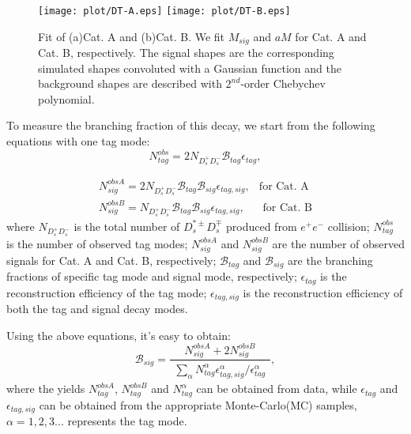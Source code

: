 {    \begin{figure*}[!htbp]
        \centering
        \texttt{[image: plot/DT-A.eps]}
        \texttt{[image: plot/DT-B.eps]}
        \caption{Fit of (a)Cat. A and (b)Cat. B.
            We fit $M_{sig}$ and $aM$ for Cat. A and Cat. B, respectively. The signal shapes are the corresponding simulated shapes convoluted with a Gaussian function and 
        the background shapes are described with $2^{nd}$-order Chebychev polynomial.}
        \label{DT-fit}
    \end{figure*}

    To measure the branching fraction of this decay, we start from the following equations with one tag mode:
    \begin{equation}
        N_{tag}^{obs} = 2N_{D_{s}^{+}D_{s}^{-}}\mathcal{B}_{tag}\epsilon_{tag}, \label{eq-ST}
    \end{equation}

    \begin{equation}
        \begin{array}{lr}
            N_{sig}^{obsA}=2N_{D_{s}^{+}D_{s}^{-}}\mathcal{B}_{tag}\mathcal{B}_{sig}\epsilon_{tag,sig}  , &\text{for Cat. A} \\
            N_{sig}^{obsB}=N_{D_{s}^{+}D_{s}^{-}}\mathcal{B}_{tag}\mathcal{B}_{sig}\epsilon_{tag,sig}  ,  &\text{  for Cat. B}  
        \end{array}
        \label{eq-DT}
    \end{equation}
    where $N_{D_{s}^{+}D_{s}^{-}}$ is the total number of $D_{s}^{*\pm}D_{s}^{\mp}$ produced from $e^{+}e^{-}$ collision; $N_{tag}^{obs}$ is the number of observed tag modes; $N_{sig}^{obsA}$ and $N_{sig}^{obsB}$ are the number of observed signals for Cat. A and Cat. B, respectively; $\mathcal{B}_{tag}$ and $\mathcal{B}_{sig}$ are the branching fractions of specific tag mode and signal mode, respectively; $\epsilon_{tag}$ is the reconstruction efficiency of the tag mode; $\epsilon_{tag,sig}$ is the reconstruction efficiency of both the tag and signal decay modes.

    Using the above equations, it's easy to obtain:
    \begin{equation}
    \mathcal{B}_{sig} = \frac{N_{sig}^{obsA}+2N_{sig}^{obsB}}{\begin{matrix}\sum_{\alpha} N_{tag}^{\alpha}\epsilon_{tag,sig}^{\alpha}/\epsilon_{tag}^{\alpha}\end{matrix}}, \label{BR-formula}
    \end{equation}
    where the yields $N_{tag}^{obsA}$, $N_{tag}^{obsB}$ and $N_{tag}^{\alpha}$ can be obtained from data, while $\epsilon_{tag}$ and $\epsilon_{tag,sig}$ can be obtained from the appropriate Monte-Carlo(MC) samples, $\alpha=1, 2, 3...$ represents the tag mode.
    

}
